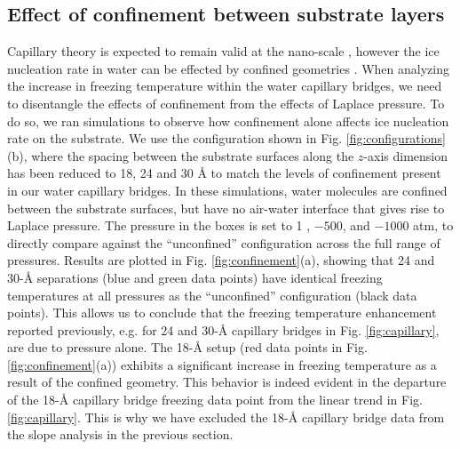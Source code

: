 \documentclass[journal abbreviation, manuscript]{copernicus}
\begin{document}
\subsection{Effect of confinement between substrate layers}
Capillary theory is expected to remain valid at the nano-scale \citep{elliott2021}, however the ice nucleation rate in water can be effected by confined geometries \citep{cao2019, roudsari2022, hussain2021contactfreezing}. When analyzing the increase in freezing temperature within the water capillary bridges, we need to disentangle the effects of confinement from the effects of Laplace pressure. To do so, we ran simulations to observe how confinement alone affects ice nucleation rate on the substrate. We use the configuration shown in Fig. \ref{fig:configurations}(b), where the spacing between the substrate surfaces along the $z$-axis dimension has been reduced to 18, 24 and 30 \AA{} to match the levels of confinement present in our water capillary bridges. In these simulations, water molecules are confined between the substrate surfaces, but have no air-water interface that gives rise to Laplace pressure. The pressure in the boxes is set to 1 , $-500$, and $-1000$ atm, to directly compare against the ``unconfined'' configuration across the full range of pressures. Results are plotted in Fig. \ref{fig:confinement}(a), showing that 24 and 30-\AA{} separations (blue and green data points) have identical freezing temperatures at all pressures as the ``unconfined'' configuration (black data points). This allows us to conclude that the freezing temperature enhancement reported previously, e.g. for 24 and 30-\AA{} capillary bridges in Fig. \ref{fig:capillary}, are due to pressure alone. The 18-\AA{} setup (red data points in Fig. \ref{fig:confinement}(a)) exhibits a significant increase in freezing temperature as a result of the confined geometry. This behavior is indeed evident in the departure of the 18-\AA{} capillary bridge freezing data point from the linear trend in Fig. \ref{fig:capillary}. This is why we have excluded the 18-\AA{} capillary bridge data from the slope analysis in the previous section.
\end{document}
